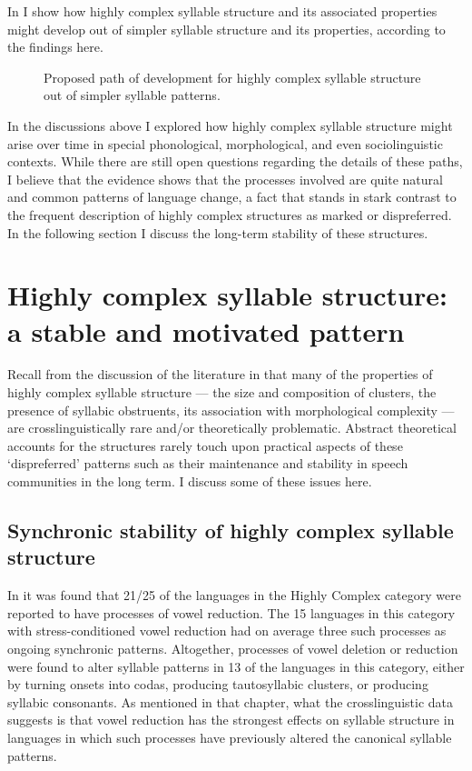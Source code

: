   In  I show how highly complex syllable structure and its associated properties might develop out of simpler syllable structure and its properties, according to the findings here.

\begin{figure}
\label{fig:}
\caption{\label{fig:8.2} Proposed path of development for highly complex syllable structure out of simpler syllable patterns.}
\end{figure}


  In the discussions above I explored how highly complex syllable structure might arise over time in special phonological, morphological, and even sociolinguistic contexts. While there are still open questions regarding the details of these paths, I believe that the evidence shows that the processes involved are quite natural and common patterns of language change, a fact that stands in stark contrast to the frequent description of highly complex structures as marked or dispreferred. In the following section I discuss the long-term stability of these structures.

\section{Highly complex syllable structure: a stable and motivated pattern}\label{sec:8.5}

  Recall from the discussion of the literature in  that many of the properties of highly complex syllable structure — the size and composition of clusters, the presence of syllabic obstruents, its association with morphological complexity — are crosslinguistically rare and/or theoretically problematic. Abstract theoretical accounts for the structures rarely touch upon practical aspects of these ‘dispreferred’ patterns such as their maintenance and stability in speech communities in the long term. I discuss some of these issues here.

\subsection{Synchronic stability of highly complex syllable structure}\label{sec:8.5.1}

  In  it was found that 21/25 of the languages in the Highly Complex category were reported to have processes of vowel reduction. The 15 languages in this category with stress-conditioned vowel reduction had on average three such processes as ongoing synchronic patterns. Altogether, processes of vowel deletion or reduction were found to alter syllable patterns in 13 of the languages in this category, either by turning onsets into codas, producing tautosyllabic clusters, or producing syllabic consonants. As mentioned in that chapter, what the crosslinguistic data suggests is that vowel reduction has the strongest effects on syllable structure in languages in which such processes have previously altered the canonical syllable patterns.

